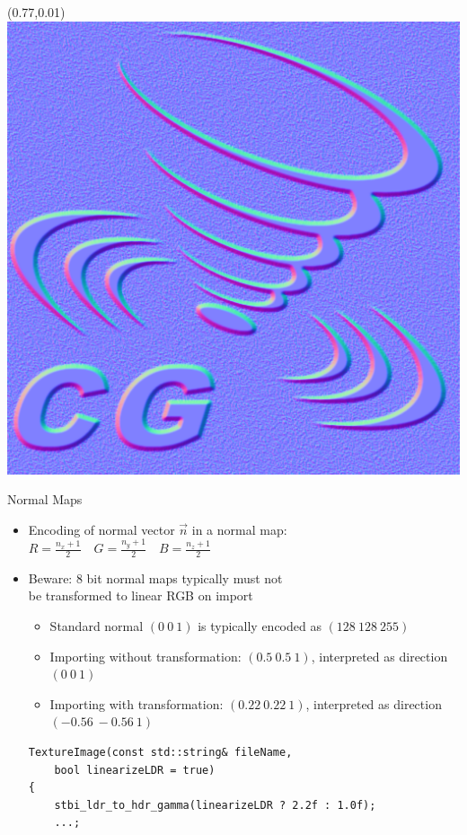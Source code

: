 \documentclass[utf8,stillsansserifmath,fleqn,t]{beamer}
\newcommand{\ds}{\displaystyle}
\begin{document}
\begin{frame}[fragile]
\frametitle{\insertsection}
\begin{textblock}{0.22}(0.77,0.01)\includegraphics[width=\textwidth]{./fig/normalmap-idea-2.png}\end{textblock}
Normal Maps
\begin{itemize}
\item Encoding of normal vector $\vec{n}$ in a normal map:\\
    $\ds R= \frac{n_x + 1}{2} \quad G= \frac{n_y + 1}{2} \quad B=  \frac{n_z + 1}{2}$
\item Beware: 8 bit normal maps typically must not\\ be transformed to linear
RGB on import
    \begin{itemize}
    \item Standard normal $(0~0~1)$ is typically encoded as
    $(128~128~255)$
    \item Importing without transformation: $(0.5~0.5~1)$, interpreted as direction $(0~0~1)$
    \item Importing with transformation: $(0.22~0.22~1)$, interpreted as direction $(-0.56~-0.56~1)$
    \end{itemize}
\begin{lstlisting}
TextureImage(const std::string& fileName,
    bool linearizeLDR = true)
{
    stbi_ldr_to_hdr_gamma(linearizeLDR ? 2.2f : 1.0f);
    ...;
\end{lstlisting}
\end{itemize}
\end{frame}
\end{document}
